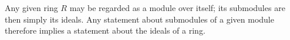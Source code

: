 Any given ring $R$ may be regarded as a module over itself; its submodules are then simply its ideals. Any statement about submodules of a given module therefore implies a statement about the ideals of a ring.
